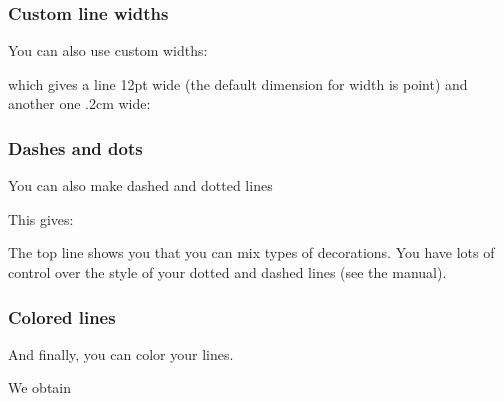 %
%
\begin{frame}[fragile]
  \frametitle{
    Custom line widths
  }

  You can also use custom widths:

  
  
  which gives a line 12pt wide (the default dimension for width is point) and another one .2cm wide:

  \begin{center}
    
  \end{center}
  
\end{frame}
%
%
\begin{frame}[fragile]
  \frametitle{
    Dashes and dots
  }

  You can also make dashed and dotted lines

  

  This gives:

    \begin{center}
    
    \end{center}

    The top line shows you that you can mix types of decorations. You have lots of control over the style of your dotted and dashed lines (see the manual).

\end{frame}
%
%
\begin{frame}[fragile]
  \frametitle{
    Colored lines
  }

  And finally, you can color your lines.

  

   We obtain

    \begin{center}
    
    \end{center}

\end{frame}

